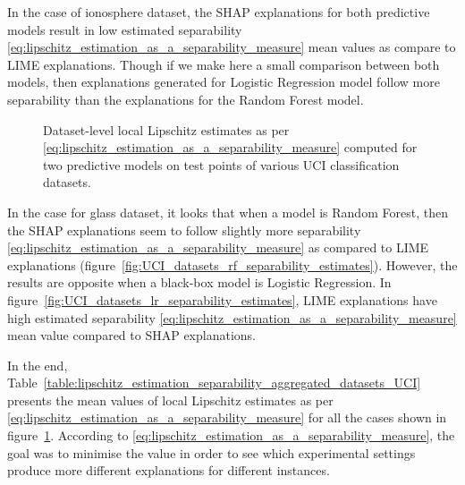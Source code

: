\documentclass[english]{tktltiki2}
\theoremstyle{definition}
\theoremstyle{remark}
\begin{document}
In the case of ionosphere dataset, the SHAP explanations for both predictive models result in low estimated separability \eqref{eq:lipschitz_estimation_as_a_separability_measure} mean values as compare to LIME explanations. Though if we make here a small comparison between both models, then explanations generated for Logistic Regression model follow more separability than the explanations for the Random Forest model.

\begin{figure}[H]
	\hspace*{\fill}%
	\caption{Dataset-level local Lipschitz estimates as per \eqref{eq:lipschitz_estimation_as_a_separability_measure} computed for two predictive models on test points of various UCI classification datasets.}%
	\label{fig:UCI_datasets_separability_estimates}%
\end{figure}

In the case for glass dataset, it looks that when a model is Random Forest, then the SHAP explanations seem to follow slightly more separability \eqref{eq:lipschitz_estimation_as_a_separability_measure}  as compared to LIME explanations (figure~\ref{fig:UCI_datasets_rf_separability_estimates}). However, the results are opposite when a black-box model is Logistic Regression. In figure~\ref{fig:UCI_datasets_lr_separability_estimates}, LIME explanations have high estimated separability \eqref{eq:lipschitz_estimation_as_a_separability_measure}  mean value compared to SHAP explanations.

In the end, Table~\ref{table:lipschitz_estimation_separability_aggregated_datasets_UCI} presents the mean values of local Lipschitz estimates as per \eqref{eq:lipschitz_estimation_as_a_separability_measure} for all the cases shown in figure~\ref{fig:UCI_datasets_separability_estimates}. According to \eqref{eq:lipschitz_estimation_as_a_separability_measure}, the goal was to minimise the value in order to see which experimental settings produce more different explanations for different instances.
\end{document}
